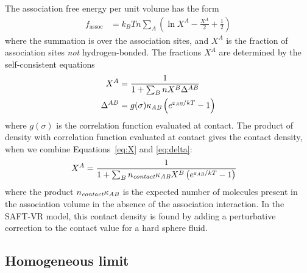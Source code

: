 \documentclass[letterpaper,twocolumn,amsmath,amssymb,prb]{revtex4-1}
\begin{document}
The association free energy per unit volume has the form
\begin{align}
  f_\text{assoc} &= k_BT n\sum_A 
                  \left(\ln X^A - \frac{X^A}{2} + \frac12\right)
\end{align}
where the summation is over the association sites, and $X^A$ is the
fraction of association sites \emph{not} hydrogen-bonded.  The
fractions $X^A$ are determined by the self-consistent equations
\begin{align}
  X^A &= \frac{1}
  {1 + \sum_B n X^B \Delta^{AB}}\label{eq:X}
  \\
  \Delta^{AB} &= g(\sigma) \kappa_\textit{AB}\left( e^{\varepsilon_\textit{AB}/kT} -
  1 \right)\label{eq:delta}
\end{align}
where $g(\sigma)$ is the correlation function evaluated at contact.
The product of density with correlation function evaluated at contact
gives the contact density, when we combine Equations~\ref{eq:X} and
\ref{eq:delta}:
\begin{align}
  X^A &= \frac{1}
  {1 + \sum_B n_\textit{contact}\kappa_\textit{AB} X^B\left( e^{\varepsilon_\textit{AB}/kT} -
  1 \right)}
\end{align}
where the product $n_\textit{contact}\kappa_\textit{AB}$ is the expected number of
molecules present in the association volume in the absence of the
association interaction.  In the SAFT-VR
model\cite{gil-villegas-1997-SAFT-VR}, this contact density is found
by adding a perturbative correction to the contact value for a hard
sphere fluid.

\subsection{Homogeneous limit}
\end{document}
